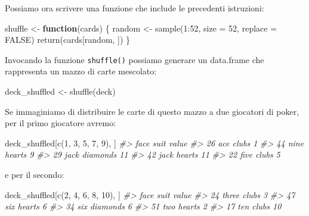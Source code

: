 \documentclass[
  11pt,
]{krantz}
\makeatletter
\newenvironment{Shaded}{\begin{snugshade}}{\end{snugshade}}
\newcommand{\AttributeTok}[1]{\textcolor[rgb]{0.61,0.61,0.61}{#1}}
\newcommand{\CommentTok}[1]{\textcolor[rgb]{0.37,0.37,0.37}{\textit{#1}}}
\newcommand{\ConstantTok}[1]{\textcolor[rgb]{0,0,0}{#1}}
\newcommand{\ControlFlowTok}[1]{\textcolor[rgb]{0.27,0.27,0.27}{\textbf{#1}}}
\newcommand{\DecValTok}[1]{\textcolor[rgb]{0.06,0.06,0.06}{#1}}
\newcommand{\FunctionTok}[1]{\textcolor[rgb]{0,0,0}{#1}}
\newcommand{\NormalTok}[1]{#1}
\newcommand{\OtherTok}[1]{\textcolor[rgb]{0.37,0.37,0.37}{#1}}
\newcommand{\SpecialCharTok}[1]{\textcolor[rgb]{0,0,0}{#1}}
\newenvironment{kframe}{%
\medskip{}
\setlength{\fboxsep}{.8em}
 \def\at@end@of@kframe{}%
 \ifinner\ifhmode%
  \def\at@end@of@kframe{\end{minipage}}%
  \begin{minipage}{\columnwidth}%
 \fi\fi%
 \def\FrameCommand##1{\hskip\@totalleftmargin \hskip-\fboxsep
 \colorbox{shadecolor}{##1}\hskip-\fboxsep
     \hskip-\linewidth \hskip-\@totalleftmargin \hskip\columnwidth}%
 \MakeFramed {\advance\hsize-\width
   \@totalleftmargin\z@ \linewidth\hsize
   \@setminipage}}%
 {\par\unskip\endMakeFramed%
 \at@end@of@kframe}
\renewenvironment{Shaded}{\begin{kframe}}{\end{kframe}}
\theoremstyle{definition}
\theoremstyle{definition}
\theoremstyle{definition}
\theoremstyle{definition}
\theoremstyle{remark}
\makeatother
\begin{document}
Possiamo ora scrivere una funzione che include le precedenti istruzioni:

\begin{Shaded}
\begin{Highlighting}[]
\NormalTok{shuffle }\OtherTok{\textless{}{-}} \ControlFlowTok{function}\NormalTok{(cards) \{}
\NormalTok{  random }\OtherTok{\textless{}{-}} \FunctionTok{sample}\NormalTok{(}\DecValTok{1}\SpecialCharTok{:}\DecValTok{52}\NormalTok{, }\AttributeTok{size =} \DecValTok{52}\NormalTok{, }\AttributeTok{replace =} \ConstantTok{FALSE}\NormalTok{) }
  \FunctionTok{return}\NormalTok{(cards[random, ])}
\NormalTok{\}}
\end{Highlighting}
\end{Shaded}

Invocando la funzione \texttt{shuffle()} possiamo generare un data.frame che rappresenta un mazzo di carte mescolato:

\begin{Shaded}
\begin{Highlighting}[]
\NormalTok{deck\_shuffled }\OtherTok{\textless{}{-}} \FunctionTok{shuffle}\NormalTok{(deck)}
\end{Highlighting}
\end{Shaded}

Se immaginiamo di distribuire le carte di questo mazzo a due giocatori di poker, per il primo giocatore avremo:

\begin{Shaded}
\begin{Highlighting}[]
\NormalTok{deck\_shuffled[}\FunctionTok{c}\NormalTok{(}\DecValTok{1}\NormalTok{, }\DecValTok{3}\NormalTok{, }\DecValTok{5}\NormalTok{, }\DecValTok{7}\NormalTok{, }\DecValTok{9}\NormalTok{), ]}
\CommentTok{\#\textgreater{}    face     suit value}
\CommentTok{\#\textgreater{} 26  ace    clubs     1}
\CommentTok{\#\textgreater{} 44 nine   hearts     9}
\CommentTok{\#\textgreater{} 29 jack diamonds    11}
\CommentTok{\#\textgreater{} 42 jack   hearts    11}
\CommentTok{\#\textgreater{} 22 five    clubs     5}
\end{Highlighting}
\end{Shaded}

e per il secondo:

\begin{Shaded}
\begin{Highlighting}[]
\NormalTok{deck\_shuffled[}\FunctionTok{c}\NormalTok{(}\DecValTok{2}\NormalTok{, }\DecValTok{4}\NormalTok{, }\DecValTok{6}\NormalTok{, }\DecValTok{8}\NormalTok{, }\DecValTok{10}\NormalTok{), ]}
\CommentTok{\#\textgreater{}     face     suit value}
\CommentTok{\#\textgreater{} 24 three    clubs     3}
\CommentTok{\#\textgreater{} 47   six   hearts     6}
\CommentTok{\#\textgreater{} 34   six diamonds     6}
\CommentTok{\#\textgreater{} 51   two   hearts     2}
\CommentTok{\#\textgreater{} 17   ten    clubs    10}
\end{Highlighting}
\end{Shaded}
\end{document}
